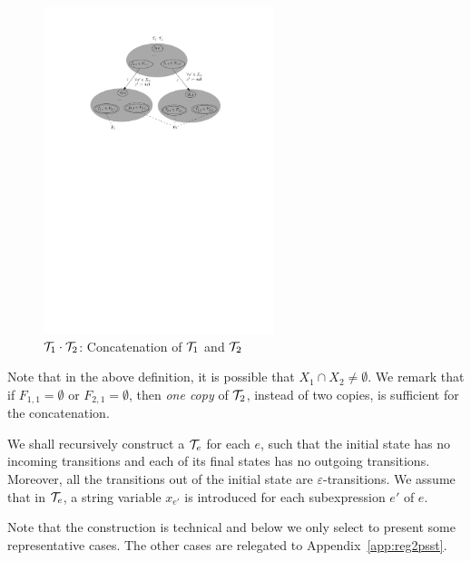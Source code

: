 \begin{definition}
\begin{itemize}
  \end{itemize}
		\begin{figure}[ht]
			\centering
			\includegraphics[width = 0.6\textwidth]{psstconcat.pdf}
			\caption{$\mathcal{T}_1\cdot \mathcal{T}_2$: Concatenation of $\mathcal{T}_1$ and $\mathcal{T}_2$}
			\label{fig-psstconcat}
		\end{figure}  
\end{definition}
Note that in the above definition, it is possible that $X_1 \cap X_2 \neq \emptyset$. We   remark that if $F_{1,1} = \emptyset$ or $F_{2,1} = \emptyset$, then \emph{one copy} of $\mathcal{T}_2$, instead of two copies, is sufficient for the concatenation.

We shall recursively construct a {\PSST} $\mathcal{T}_e$ for each {\pcre} $e$, such that the initial state has no incoming transitions and each of its final states has no outgoing transitions. Moreover, all the transitions out of the initial state are $\varepsilon$-transitions. 
%
We assume that in $\mathcal{T}_e$, a string variable $x_{e'}$ is introduced for each subexpression $e'$ of $e$. 

Note that the construction is technical and below we only select to present some representative cases. The other cases are relegated to Appendix~\ref{app:reg2psst}.

